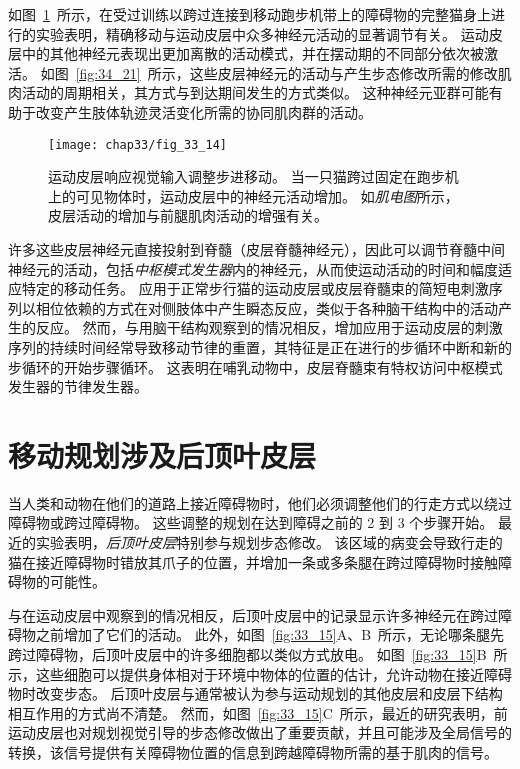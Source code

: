 如图~\ref{fig:33_14}~所示，在受过训练以跨过连接到移动跑步机带上的障碍物的完整猫身上进行的实验表明，精确移动与运动皮层中众多神经元活动的显著调节有关。
运动皮层中的其他神经元表现出更加离散的活动模式，并在摆动期的不同部分依次被激活。
如图~\ref{fig:34_21}~所示，这些皮层神经元的活动与产生步态修改所需的修改肌肉活动的周期相关，其方式与到达期间发生的方式类似。
这种神经元亚群可能有助于改变产生肢体轨迹灵活变化所需的协同肌肉群的活动。


\begin{figure}[htbp]
	\centering
	\texttt{[image: chap33/fig\_33\_14]}
	\caption{运动皮层响应视觉输入调整步进移动。
		当一只猫跨过固定在跑步机上的可见物体时，运动皮层中的神经元活动增加。
		如\textit{肌电图}所示，皮层活动的增加与前腿肌肉活动的增强有关\cite{drew1988motor}。}
	\label{fig:33_14}
\end{figure}


许多这些皮层神经元直接投射到脊髓（皮层脊髓神经元），因此可以调节脊髓中间神经元的活动，包括\textit{中枢模式发生器}内的神经元，从而使运动活动的时间和幅度适应特定的移动任务。
应用于正常步行猫的运动皮层或皮层脊髓束的简短电刺激序列以相位依赖的方式在对侧肢体中产生瞬态反应，类似于各种脑干结构中的活动产生的反应。
然而，与用脑干结构观察到的情况相反，增加应用于运动皮层的刺激序列的持续时间经常导致移动节律的重置，其特征是正在进行的步循环中断和新的步循环的开始步骤循环。
这表明在哺乳动物中，皮层脊髓束有特权访问中枢模式发生器的节律发生器。



\section{移动规划涉及后顶叶皮层}

当人类和动物在他们的道路上接近障碍物时，他们必须调整他们的行走方式以绕过障碍物或跨过障碍物。
这些调整的规划在达到障碍之前的 2 到 3 个步骤开始。
最近的实验表明，\textit{后顶叶皮层}特别参与规划步态修改。
该区域的病变会导致行走的猫在接近障碍物时错放其爪子的位置，并增加一条或多条腿在跨过障碍物时接触障碍物的可能性。


与在运动皮层中观察到的情况相反，后顶叶皮层中的记录显示许多神经元在跨过障碍物之前增加了它们的活动。
此外，如图~\ref{fig:33_15}A、B~所示，无论哪条腿先跨过障碍物，后顶叶皮层中的许多细胞都以类似方式放电。
如图~\ref{fig:33_15}B~所示，这些细胞可以提供身体相对于环境中物体的位置的估计，允许动物在接近障碍物时改变步态。
后顶叶皮层与通常被认为参与运动规划的其他皮层和皮层下结构相互作用的方式尚不清楚。
然而，如图~\ref{fig:33_15}C~所示，最近的研究表明，前运动皮层也对规划视觉引导的步态修改做出了重要贡献，并且可能涉及全局信号的转换，该信号提供有关障碍物位置的信息到跨越障碍物所需的基于肌肉的信号。


